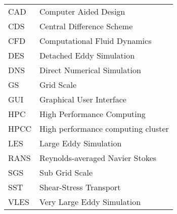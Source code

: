 \begin{table}[h]
\begin{tabular}{ll}
CAD&Computer Aided Design\\
CDS&Central Difference Scheme\\
CFD&Computational Fluid Dynamics\\
DES&Detached Eddy Simulation\\
DNS&Direct Numerical Simulation\\
GS&Grid Scale\\
GUI&Graphical User Interface\\
HPC&High Performance Computing\\
HPCC&High performance computing cluster\\
LES&Large Eddy Simulation\\
RANS&Reynolds-averaged Navier Stokes\\
SGS&Sub Grid Scale\\
SST&Shear-Stress Transport\\
VLES&Very Large Eddy Simulation\\
\end{tabular}
\end{table}